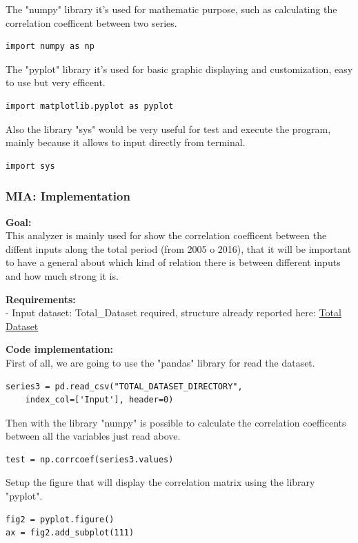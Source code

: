 The "numpy" library it's used for mathematic purpose, such as calculating the correlation coefficent between two series.
\begin{lstlisting}
import numpy as np
\end{lstlisting}
 
The "pyplot" library it's used for basic graphic displaying and customization, easy to use but very efficent.
\begin{lstlisting}
import matplotlib.pyplot as pyplot
\end{lstlisting}

Also the library "sys" would be very useful for test and execute the program, mainly because it allows to input directly from terminal.
\begin{lstlisting}
import sys
\end{lstlisting}

\newpage
\subsubsection{MIA: Implementation}
\textbf{Goal:}\\
This analyzer is mainly used for show the correlation coefficent between the diffent inputs along the total period (from 2005 o 2016), that it will be important to have a general about which kind of relation there is between different inputs and how much strong it is.

\textbf{Requirements:}\\
- Input dataset: Total\_Dataset required, structure already reported here:
\hyperref[table: Total_Dataset]{Total Dataset}

\textbf{Code implementation:}\\
First of all, we are going to use the "pandas" library for read the dataset.
\begin{lstlisting}
series3 = pd.read_csv("TOTAL_DATASET_DIRECTORY", 
	index_col=['Input'], header=0)
\end{lstlisting}

Then with the library "numpy" is possible to calculate the correlation coefficents between all the variables just read above.
\begin{lstlisting}
test = np.corrcoef(series3.values)
\end{lstlisting}

Setup the figure that will display the correlation matrix using the library "pyplot".
\begin{lstlisting}
fig2 = pyplot.figure()
ax = fig2.add_subplot(111)
\end{lstlisting}


